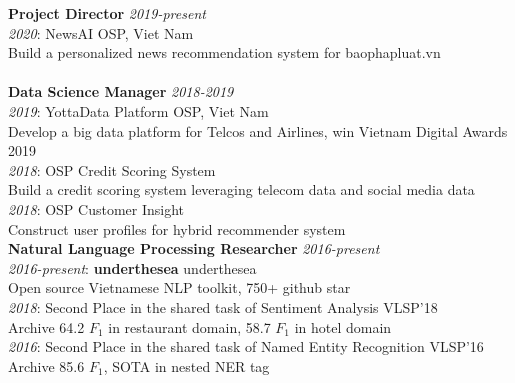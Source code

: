\documentclass[11pt,a4paper,roman]{article}
\begin{document}
\textbf{Project Director}
\hfill
\textit{2019-present}
\\
\textit{2020}: NewsAI
\hfill
OSP, Viet Nam
\\
Build a personalized news recommendation system for baophapluat.vn
\\\\
\textbf{Data Science Manager}
\hfill
\textit{2018-2019}
\\
\textit{2019}: YottaData Platform
\hfill
OSP, Viet Nam
\\
Develop a big data platform for Telcos and Airlines, win Vietnam Digital Awards 2019
\\
\textit{2018}: OSP Credit Scoring System
\\
Build a credit scoring system leveraging telecom data and social media data
\\
\textit{2018}: OSP Customer Insight
\\
Construct user profiles for hybrid recommender system
\\


\noindent
\textbf{Natural Language Processing Researcher}
\hfill
\textit{2016-present}
\\
\textit{2016-present}: \textbf{underthesea}
\hfill
underthesea
\\\noindent
Open source Vietnamese NLP toolkit, 750+ github star
\\
\textit{2018}: Second Place in the shared task of Sentiment Analysis VLSP'18
\\
Archive 64.2 $F_{1}$ in restaurant domain, 58.7 $F_{1}$ in hotel domain
\\
\textit{2016}: Second Place in the shared task of Named Entity Recognition VLSP'16
\\
Archive 85.6 $F_{1}$, SOTA in nested NER tag
\\
\end{document}
